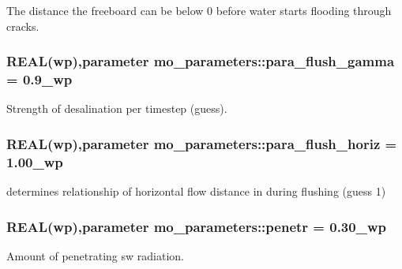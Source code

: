 The distance the freeboard can be below 0 before water starts flooding through cracks. 

\hypertarget{namespacemo__parameters_a15fb04a55119c8da15569d72bc5cf370}{
\subsubsection[{para\_\-flush\_\-gamma}]{\setlength{\rightskip}{0pt plus 5cm}REAL({\bf wp}),parameter {\bf mo\_\-parameters::para\_\-flush\_\-gamma} = 0.9\_\-wp}}
\label{namespacemo__parameters_a15fb04a55119c8da15569d72bc5cf370}


Strength of desalination per timestep (guess). 

\hypertarget{namespacemo__parameters_af4be8b247f00cf308e1974266c326fdd}{
\subsubsection[{para\_\-flush\_\-horiz}]{\setlength{\rightskip}{0pt plus 5cm}REAL({\bf wp}),parameter {\bf mo\_\-parameters::para\_\-flush\_\-horiz} = 1.00\_\-wp}}
\label{namespacemo__parameters_af4be8b247f00cf308e1974266c326fdd}


determines relationship of horizontal flow distance in during flushing (guess 1) 

\hypertarget{namespacemo__parameters_acf5feb0682a207698942d8764a0fc529}{
\subsubsection[{penetr}]{\setlength{\rightskip}{0pt plus 5cm}REAL({\bf wp}),parameter {\bf mo\_\-parameters::penetr} = 0.30\_\-wp}}
\label{namespacemo__parameters_acf5feb0682a207698942d8764a0fc529}


Amount of penetrating sw radiation. 

